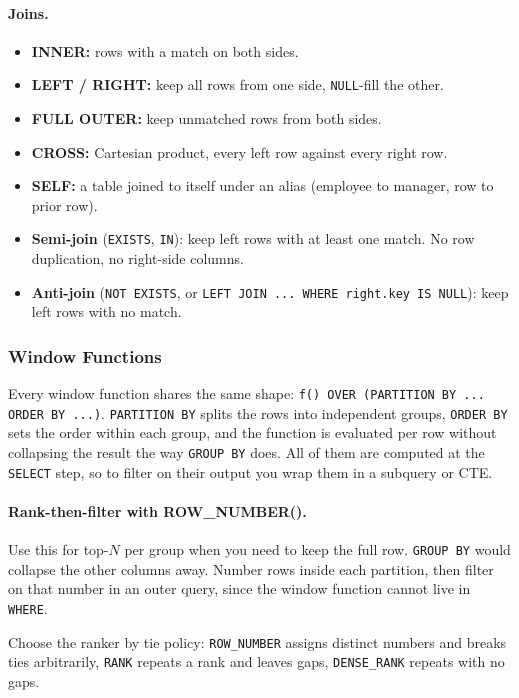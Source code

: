 \paragraph{Joins.}
\begin{itemize}[label=$\circ$]
  \item \textbf{INNER:} rows with a match on both sides.
  \item \textbf{LEFT / RIGHT:} keep all rows from one side, \texttt{NULL}-fill the other.
  \item \textbf{FULL OUTER:} keep unmatched rows from both sides.
  \item \textbf{CROSS:} Cartesian product, every left row against every right row.
  \item \textbf{SELF:} a table joined to itself under an alias (employee to manager, row to prior row).
  \item \textbf{Semi-join} (\texttt{EXISTS}, \texttt{IN}): keep left rows with at least one match. No row duplication, no right-side columns.
  \item \textbf{Anti-join} (\texttt{NOT EXISTS}, or \texttt{LEFT JOIN ... WHERE right.key IS NULL}): keep left rows with no match.
\end{itemize}

\subsubsection{Window Functions}

Every window function shares the same shape:
\texttt{f() OVER (PARTITION BY ... ORDER BY ...)}. \texttt{PARTITION BY} splits
the rows into independent groups, \texttt{ORDER BY} sets the order within each
group, and the function is evaluated per row without collapsing the result the
way \texttt{GROUP BY} does. All of them are computed at the \texttt{SELECT}
step, so to filter on their output you wrap them in a subquery or CTE.

\paragraph{Rank-then-filter with ROW\_NUMBER().} Use this for top-$N$ per
group when you need to keep the full row. \texttt{GROUP BY} would collapse the
other columns away. Number rows inside each partition, then filter on that
number in an outer query, since the window function cannot live in
\texttt{WHERE}.

Choose the ranker by tie policy: \texttt{ROW\_NUMBER} assigns distinct numbers
and breaks ties arbitrarily, \texttt{RANK} repeats a rank and leaves gaps,
\texttt{DENSE\_RANK} repeats with no gaps.

